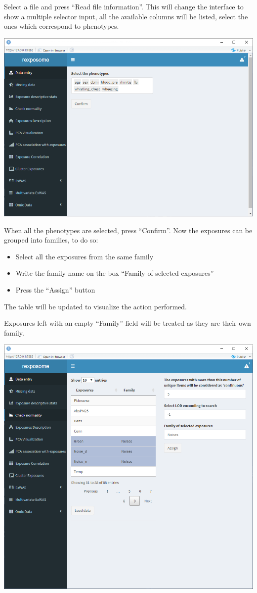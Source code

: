 \documentclass[
]{book}
\providecommand{\tightlist}{%
  \setlength{\itemsep}{0pt}\setlength{\parskip}{0pt}}
\begin{document}
Select a file and press ``Read file information''. This will change the interface to show a multiple selector input, all the available columns will be listed, select the ones which correspond to phenotypes.

\includegraphics{images/plain_table_2.png}

When all the phenotypes are selected, press ``Confirm''. Now the exposures can be grouped into families, to do so:

\begin{itemize}
\tightlist
\item
  Select all the exposures from the same family
\item
  Write the family name on the box ``Family of selected exposures''
\item
  Press the ``Assign'' button
\end{itemize}

The table will be updated to visualize the action performed.

Exposures left with an empty ``Family'' field will be treated as they are their own family.

\includegraphics{images/plain_table_3.png}
\end{document}
